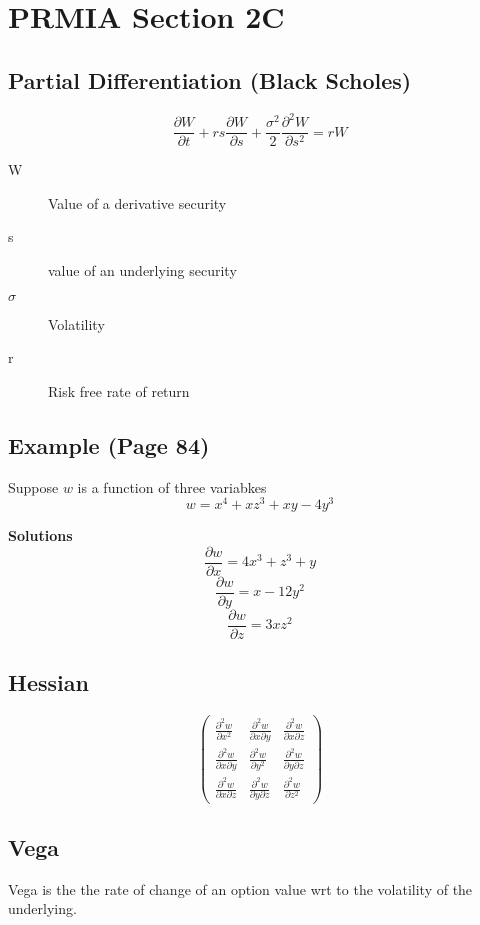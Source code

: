 \documentclass[]{article}
\begin{document}
\section{PRMIA Section 2C}

\subsection{Partial Differentiation (Black Scholes)}

\[  \frac{\partial W}{\partial t} +  rs\frac{\partial W}{\partial s} +  \frac{\sigma^2}{2}  \frac{\partial^2 W}{\partial s^2} = rW   \]

\begin{description}
\item[W] Value of a derivative security
\item[s] value of an underlying security
\item[$\sigma$] Volatility 
\item[r] Risk free rate of return
\end{description}

\subsection{Example (Page 84)}

Suppose $w$ is a function of three variabkes
\[w = x^4 + xz^3 + xy -4y^3 \]

\textbf{Solutions}
\[ \frac{\partial w}{\partial x} = 4x^3 + z^3 +y \]
\[ \frac{\partial w}{\partial y} = x-12y^2\]
\[ \frac{\partial w}{\partial z} = 3xz^2 \]

\subsection{Hessian}

\[ \left( \begin{array}{ccc}
 \frac{\partial^2 w}{\partial x^2} & \frac{\partial^2 w}{\partial x \partial y} & \frac{\partial^2 w}{\partial x \partial z} \\ 
\frac{\partial^2 w}{\partial x \partial y} & \frac{\partial^2 w}{\partial y^2} & \frac{\partial^2 w}{\partial y \partial z}  \\ 
\frac{\partial^2 w}{\partial x \partial z} & \frac{\partial^2 w}{\partial y \partial z} & \frac{\partial^2 w}{\partial z^2}
\end{array} \right)\]

\subsection{Vega}
Vega is the the rate of change of an option value wrt to the volatility of the underlying.
\end{document}
